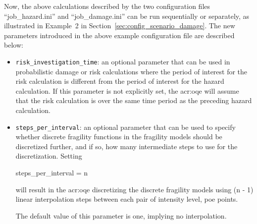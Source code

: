 Now, the above calculations described by the two configuration files
``job\_hazard.ini'' and ``job\_damage.ini'' can be run sequentially or
separately, as illustrated in Example~2 in
Section~\ref{sec:config_scenario_damage}. The new parameters introduced in the
above example configuration file are described below:

\begin{itemize}

  \item \Verb+risk_investigation_time+: an optional parameter that can be used
    in probabilistic damage or risk calculations where the period of interest
    for the risk calculation is different from the period of interest for the 
    hazard calculation. If this parameter is not explicitly set, the 
    \glsdesc{acr:oqe} will assume that the risk calculation is over the same 
    time period as the preceding hazard calculation.

  \item \Verb+steps_per_interval+: an optional parameter that can be used to
    specify whether discrete fragility functions in the fragility models should
    be discretized further, and if so, how many intermediate steps to use for
    the discretization. Setting 

    steps\_per\_interval = n

    will result in the \glsdesc{acr:oqe} discretizing the discrete fragility
    models using (n - 1) linear interpolation steps between each pair of 
    {intensity level, poe} points.

    The default value of this parameter is one, implying no interpolation.

\end{itemize}
